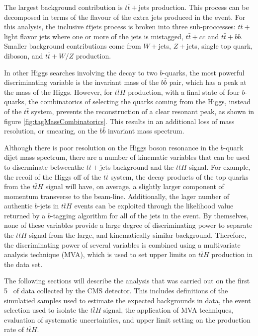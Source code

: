 \par The largest background contribution is $t\bar{t}+$jets
production.  This process can be decomposed in terms of the flavour of
the extra jets produced in the event.  For this analysis, the
inclusive $t\bar{t}$jets process is broken into three sub-proccesses:
$t\bar{t}+$ light flavor jets where one or more 
of the jets is mistagged, $t\bar{t}+c\bar{c}$ and $t\bar{t}+b\bar{b}$.
Smaller background contributions come from $W+$jets, $Z+$jets, single
top quark, diboson, and $t\bar{t}+W/Z$ production.  

\par In other Higgs searches involving the decay to two $b$-quarks,
the most powerful discriminating variable is the invariant mass of the
$b\bar{b}$ pair, which has a peak at the mass of the Higgs.  However, for
$t\bar{t}H$ production, with a final state of four $b$-quarks, the
combinatorics of selecting the quarks coming from the Higgs, instead
of the $t\bar{t}$ system, prevents the reconstruction of a clear
resonant peak, as shown in figure \ref{fig:tagMassCombinatorics}.
This results in an additional loss of mass resolution, or smearing,
on the $b\bar{b}$ invariant mass spectrum. 

\par Although there is poor resolution on the Higgs boson resonance in
the $b$-quark dijet mass spectrum, there are a number of kinematic
variables that can be used to discrminate betweenthe $t\bar{t}+$jets
background and the $t\bar{t}H$ signal.  For example, the recoil of
the Higgs off of the $t\bar{t}$ system, the decay products of the top
quarks from the $t\bar{t}H$ signal will have, on average, a slightly
larger component of momentum transverse to the beam-line.
Additionally, the lager number of authentic $b$-jets in $t\bar{t}H$
events can be exploited through the likelihood value returned by a
$b$-tagging algorithm for all of the jets in the event.  By
themselves, none of these variables provide a large degree of
discriminating power to separate the $t\bar{t}H$ signal from the
large, and kinematically similar background.  Therefore, the
discriminating power of several variables is combined using a
multivariate analysis technique (MVA), which is used to set upper
limits on $t\bar{t}H$ production in the data set. 

\par The following sections will describe the analysis that was
carried out on the first 5 \fbinv~of data collected by the CMS
detector.  This includes definitions of the simulatied samples used to
estimate the expected backgrounds in data, the event selection used to
isolate the $t\bar{t}H$ signal, the application of MVA techniques,
evaluation of systematic uncertainties, and upper limit setting on the
production rate of $t\bar{t}H$. 


